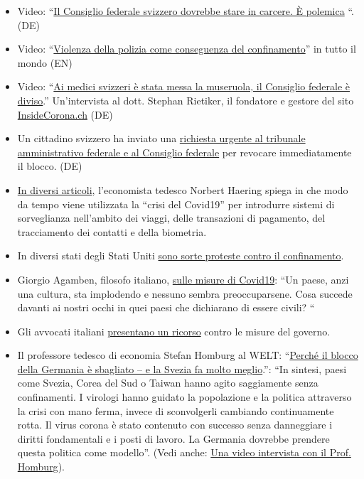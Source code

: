 \begin{itemize}
\tightlist
\item
  Video: ``\href{https://www.youtube.com/watch?v=SO2JMkKtq40}{Il
  Consiglio federale svizzero dovrebbe stare in carcere. È polemica} ``.
  (DE)
\item
  Video:
  ``\href{https://archive.org/details/what-in-the-world-is-actually-going-on-document-reveals-plans-step-by-step}{Violenza
  della polizia come conseguenza del confinamento}'' in tutto il mondo
  (EN)\\
\item
  Video: ``\href{https://www.youtube.com/watch?v=eU6IdglI-wc}{Ai medici
  svizzeri è stata messa la museruola, il Consiglio federale è
  diviso}.'' Un'intervista al dott. Stephan Rietiker, il fondatore e
  gestore del sito
  \href{https://www.insidecorona.ch/blog-1}{InsideCorona.ch} (DE)
\item
  Un cittadino svizzero ha inviato una
  \href{https://faktenb-covid-19-massnahmen.jimdofree.com/}{richiesta
  urgente al tribunale amministrativo federale e al Consiglio federale}
  per revocare immediatamente il blocco. (DE)
\item
  \href{https://norberthaering.de/}{In diversi articoli}, l'economista
  tedesco Norbert Haering spiega in che modo da tempo viene utilizzata
  la ``crisi del Covid19'' per introdurre sistemi di sorveglianza
  nell'ambito dei viaggi, delle transazioni di pagamento, del
  tracciamento dei contatti e della biometria.
\item
  In diversi stati degli Stati Uniti
  \href{https://news.yahoo.com/protests-draw-thousands-over-state-024328374.html}{sono
  sorte proteste contro il confinamento}.
\item
  Giorgio Agamben, filosofo italiano,
  \href{https://www.nzz.ch/feuilleton/coronavirus-giorgio-agamben-zum-zusammenbruch-der-demokratie-ld.1551896}{sulle
  misure di Covid19}: ``Un paese, anzi una cultura, sta implodendo e
  nessuno sembra preoccuparsene. Cosa succede davanti ai nostri occhi in
  quei paesi che dichiarano di essere civili? ``
\item
  Gli avvocati italiani
  \href{https://www.tvprato.it/2020/04/la-camera-civile-degli-avvocati-pratesi-chiede-lannullamento-del-dpcm-del-10-aprile-e-illegittimo/}{presentano
  un ricorso} contro le misure del governo.
\item
  Il professore tedesco di economia Stefan Homburg al WELT:
  ``\href{https://www.msn.com/de-de/nachrichten/coronavirus/warum-deutschlands-lockdown-falsch-ist-\%E2\%80\%93-und-schweden-vieles-besser-macht/ar-BB12E6km}{Perché
  il blocco della Germania è sbagliato -- e la Svezia fa molto
  meglio}.'': ``In sintesi, paesi come Svezia, Corea del Sud o Taiwan
  hanno agito saggiamente senza confinamenti. I virologi hanno guidato
  la popolazione e la politica attraverso la crisi con mano ferma,
  invece di sconvolgerli cambiando continuamente rotta. Il virus corona
  è stato contenuto con successo senza danneggiare i diritti
  fondamentali e i posti di lavoro. La Germania dovrebbe prendere questa
  politica come modello''. (Vedi anche:
  \href{https://www.youtube.com/watch?v=Vy-VuSRoNPQ}{Una video
  intervista con il Prof. Homburg}).
\end{itemize}

